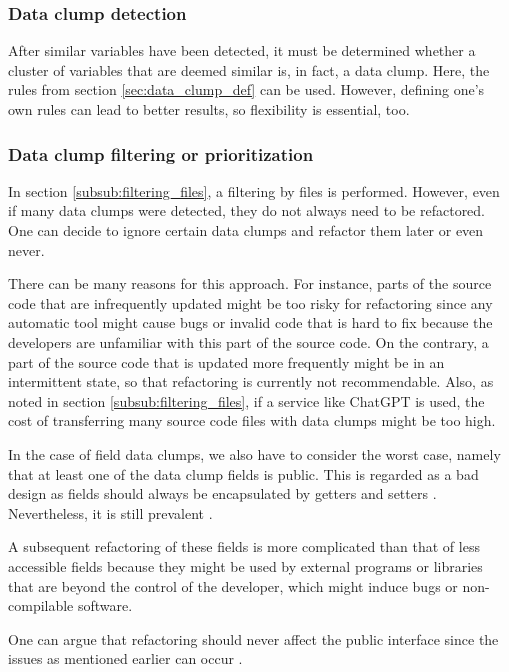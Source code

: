 \subsubsection{Data clump detection}
After similar variables have been detected, it must be determined whether a cluster of variables that are deemed similar is, in fact, a data clump. Here, the rules from section \ref{sec:data_clump_def} can be used. However, defining one's own rules can lead to better results, so flexibility is essential, too. 

\subsubsection{Data clump filtering or prioritization} \label{subsub:filtering_data_clumps}
In section \ref{subsub:filtering_files}, a filtering by files is performed. However, even if many data clumps were detected, they do not always need to be refactored. One can decide to ignore certain data clumps and refactor them later or even never. 

There can be many reasons for this approach. For instance, parts of the source code that are infrequently updated might be too risky for refactoring since any automatic tool might cause bugs or invalid code that is hard to fix because the developers are unfamiliar with this part of the source code. On the contrary, a part of the source code that is updated more frequently might be in an intermittent state, so that refactoring is currently not recommendable. Also, as noted in section  \ref{subsub:filtering_files}, if a service like ChatGPT is used, the cost of transferring many source code files with data clumps might be too high. 

In the case of field data clumps, we also have to consider the worst case, namely that at least one of the data clump fields is public. This is regarded as a bad design as fields should always be encapsulated by getters and setters \cite{5680918}. Nevertheless, it is still prevalent \cite{5076631}.

A subsequent refactoring of these fields is more complicated than that of less accessible fields because they might be used by external programs or libraries that are beyond the control of the developer, which might induce bugs or non-compilable software. 

One can argue that refactoring should never affect the public interface since the issues as mentioned earlier can occur \cite{10.1145/1352678.1352681}.

